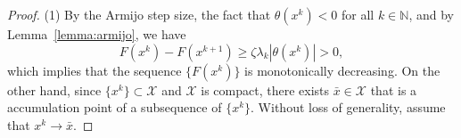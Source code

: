 \documentclass[pdflatex,sn-mathphys-num]{sn-jnl}%
\theoremstyle{definition} %
\theoremstyle{remark} %
\begin{document}
        \begin{proof}
        (1) By the Armijo step size, the fact that $\theta(x^k)<0$ for all $k \in \mathbb{N}$, and by Lemma~\ref{lemma:armijo}, we have
        \begin{equation}\label{eq FFDes}
            F(x^k)- F(x^{k+1}) \geq \zeta \lambda_k\left|\theta(x^k)\right|>0,
        \end{equation}
        which implies that the sequence $\{F(x^k)\}$ is monotonically decreasing. On the other hand, since $\{x^k\} \subset \mathcal{X}$ and $\mathcal{X}$ is compact, there exists $\bar{x} \in \mathcal{X}$ that is a accumulation point of a subsequence of $\{x^k\}$. Without loss of generality, assume that $x^k \rightarrow \bar{x}$.

        


\end{proof}
\end{document}
